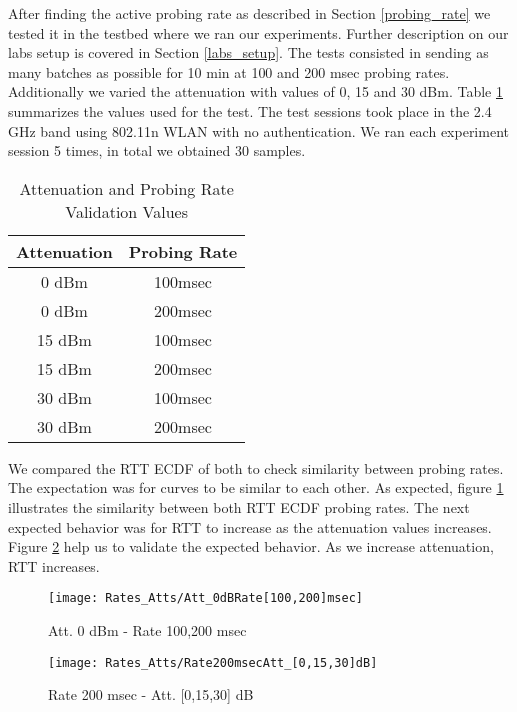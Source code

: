 After finding the active probing rate as described in Section \ref{probing_rate} we tested it in the testbed where we ran our experiments. Further description on our labs setup is covered in Section \ref{labs_setup}. The tests consisted in sending as many batches as possible for 10 min at 100 and 200 msec probing rates. Additionally we varied the attenuation with values of 0, 15 and 30 dBm. Table \ref{table:Att_Rate_Test_Values} summarizes the values used for the test. The test sessions took place in the 2.4 GHz band using 802.11n WLAN with no authentication. We ran each experiment session 5 times, in total we obtained 30 samples.

\begin{table}[h]
	\begin{center}
		\begin{tabular}{||c c||}
			\hline
			Attenuation & Probing Rate\\ [0.5ex] 
			\hline\hline
			0 dBm & 100msec\\ 
			\hline
			0 dBm & 200msec\\
			\hline
			15 dBm & 100msec\\
			\hline
			15 dBm & 200msec\\
			\hline
			30 dBm & 100msec\\
			\hline
			30 dBm & 200msec\\ [1ex] 
			\hline
		\end{tabular}
	\end{center}
	\caption{Attenuation and Probing Rate Validation Values}
	\label{table:Att_Rate_Test_Values}
\end{table}

We compared the RTT ECDF of both to check similarity between probing rates. The expectation was for curves to be similar to each other. As expected, figure \ref{fig:att_0_100and200msec} illustrates the similarity between both RTT ECDF probing rates. The next expected behavior was for RTT to increase as the attenuation values increases. Figure \ref{fig:rate_200msec_Att_0_15_30dBm} help us to validate the expected behavior. As we increase attenuation, RTT increases.

\begin{figure*}[t]
	\begin{subfigure}[t]{.53\textwidth}
		\centering
		\texttt{[image: Rates\_Atts/Att\_0dBRate[100,200]msec]}
		\caption{Att. 0 dBm - Rate 100,200 msec}
		\label{fig:att_0_100and200msec}
	\end{subfigure}\hfill
	\begin{subfigure}[t]{.53\textwidth}
		\centering
		\texttt{[image: Rates\_Atts/Rate200msecAtt\_[0,15,30]dB]}
		\caption{Rate 200 msec - Att. [0,15,30] dB}
		\label{fig:rate_200msec_Att_0_15_30dBm}
	\end{subfigure}
	\caption{RTT ECDFs for Attenuation and Probing Rate in Testbed}
\end{figure*}
\newpage